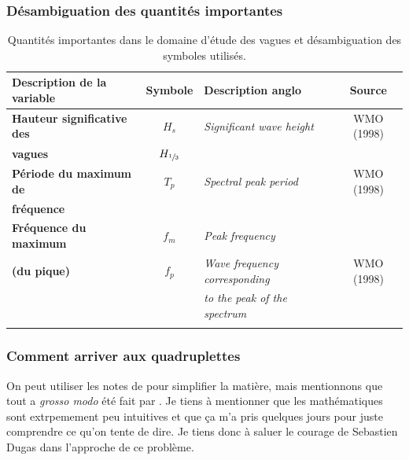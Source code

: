 \documentclass[10pt]{article}
\numberwithin{equation}{section}
\begin{document}
\subsubsection{Désambiguation des quantités importantes}
\label{sec:org7579b80}

\begin{table}[htbp]
\caption{Quantités importantes dans le domaine d'étude des vagues et désambiguation des symboles utilisés.}
\centering
\begin{tabular}{lclc}
Description de la variable & Symbole & Description anglo & Source\\
\hline
\hline
\textbf{Hauteur significative des} & \(H_s\) & \emph{Significant wave height} & WMO (1998)\\
\textbf{vagues} & \(H_{\sfrac{1}{3}}\) &  & \Textcite{goda1988variablity}\\
\hline
\textbf{Période du maximum de} & \(T_p\) & \emph{Spectral peak period} & WMO (1998)\\
\textbf{fréquence} &  &  & \\
\hline
\textbf{Fréquence du maximum} & \(f_m\) & \emph{Peak frequency} & \Textcite{hasselmann1973measurements}\\
\textbf{(du pique)} & \(f_p\) & \emph{Wave frequency corresponding} & WMO (1998)\\
 &  & \emph{to the peak of the spectrum} & \\
\hline
 &  &  & \\
\end{tabular}
\end{table}
\subsubsection{Comment arriver aux quadruplettes}
\label{sec:orga04f757}

On peut utiliser les notes de \Textcite[Chap.4 \emph{Nonlinear wave–wave interactions and wave dissipation}]{Janssen2004chap4} pour simplifier la matière, mais mentionnons que tout a \emph{grosso modo} été fait par \Textcite{Hasselmann_1962}.
Je tiens à mentionner que les mathématiques sont extrpemement peu intuitives et que ça m'a pris quelques jours pour juste comprendre ce qu'on tente de dire. Je tiens donc à saluer le courage de Sebastien Dugas dans l'approche de ce problème. \bigskip
\end{document}
